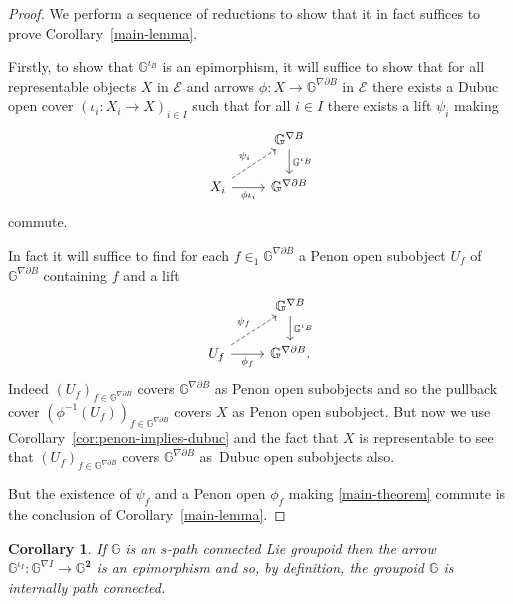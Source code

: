 \documentclass[10pt,a4paper]{amsart}
\numberwithin{equation}{section}
\newtheorem{Corollary}[Theorem]{Corollary}
\begin{document}
\begin{proof}We perform a sequence of reductions to show that it in fact suf\/f\/ices to prove Corollary~\ref{main-lemma}.

Firstly, to show that $\mathbb{G}^{\iota_B}$ is an epimorphism, it will suf\/f\/ice to show that for all representable objects $X$ in $\mathcal{E}$ and arrows $\phi\colon X \rightarrow \mathbb{G}^{\nabla\partial B}$ in $\mathcal{E}$ there exists a Dubuc open cover $(\iota_i\colon X_i \rightarrow X)_{i\in I}$ such that for all $i\in I$ there exists a lift $\psi_i$ making
\begin{equation*}
\begin{tikzcd}
 {} & \mathbb{G}^{\nabla B} \dar{\mathbb{G}^{\iota_B}}\\
 X_i \rar[swap]{\phi\iota_i} \urar[dashed]{\psi_i} & \mathbb{G}^{\nabla\partial B}
\end{tikzcd}
\end{equation*}
commute.

In fact it will suf\/f\/ice to f\/ind for each $f\in_1 \mathbb{G}^{\nabla\partial B}$ a Penon open subobject $U_f$ of $\mathbb{G}^{\nabla\partial B}$ containing $f$ and a lift
\begin{equation}\label{main-theorem}
\begin{tikzcd}
 {} & \mathbb{G}^{\nabla B} \dar{\mathbb{G}^{\iota_B}}\\
 U_f \rar[swap]{\phi_f} \urar[dashed]{\psi_f} & \mathbb{G}^{\nabla\partial B}.
\end{tikzcd}
\end{equation}
Indeed $(U_f)_{f\in \mathbb{G}^{\nabla\partial B}}$ covers $\mathbb{G}^{\nabla\partial B}$ as Penon open subobjects and so the pullback cover \linebreak $(\phi^{-1}(U_f))_{f\in\mathbb{G}^{\nabla\partial B}}$ covers $X$ as Penon open subobject. But now we use Corollary~\ref{cor:penon-implies-dubuc} and the fact that $X$ is representable to see that $(U_f)_{f\in \mathbb{G}^{\nabla\partial B}}$ covers $\mathbb{G}^{\nabla\partial B}$ as~Dubuc open subobjects also.

But the existence of $\psi_f$ and a Penon open $\phi_f$ making \eqref{main-theorem} commute is the conclusion of Corollary~\ref{main-lemma}.
\end{proof}

\begin{Corollary}If $\mathbb{G}$ is an $s$-path connected Lie groupoid then the arrow $\mathbb{G}^{\iota_I}\colon \mathbb{G}^{\nabla I}\rightarrow \mathbb{G}^{\mathbf{2}}$ is an epimorphism and so, by definition, the groupoid $\mathbb{G}$ is internally path connected.
\end{Corollary}
\end{document}

